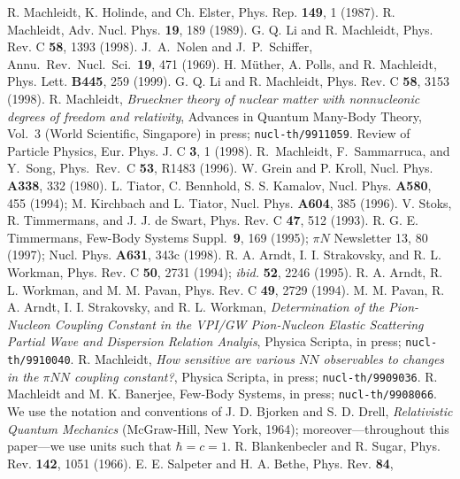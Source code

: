 \begin{references}
 R. Machleidt, K. Holinde, and Ch. Elster,
Phys. Rep. {\bf 149}, 1 (1987).
 R. Machleidt, Adv. Nucl. Phys. {\bf 19}, 189 (1989).
 G. Q. Li and R. Machleidt, Phys. Rev. C {\bf 58}, 1393 (1998).
 J.\ A.\ Nolen and J.\ P.\ Schiffer, Annu.\ Rev.\ Nucl.\ Sci.\
{\bf 19}, 471 (1969).
 H. M\"uther, A. Polls, and R. Machleidt,
Phys. Lett. {\bf B445}, 259 (1999).
 G. Q. Li and R. Machleidt, Phys. Rev. C {\bf 58}, 3153 (1998).
\bibitem{Mac99a} R. Machleidt, {\it Brueckner theory of nuclear matter
with nonnucleonic degrees of freedom and relativity},
Advances in Quantum Many-Body Theory,
Vol.~3 (World Scientific, Singapore) in press; {\tt nucl-th/9911059}.
\bibitem{PDG98} Review of Particle Physics, 
Eur. Phys. J. C {\bf 3}, 1 (1998).
 R.\ Machleidt, F.\ Sammarruca, and Y.\ Song,
Phys.\ Rev.\ C {\bf 53}, R1483 (1996).
 W. Grein and P. Kroll, Nucl. Phys. {\bf A338},
332 (1980).
 L. Tiator, C. Bennhold, S. S. Kamalov,
Nucl. Phys. {\bf A580}, 455 (1994);
M. Kirchbach and L. Tiator, Nucl. Phys. {\bf A604}, 385 (1996).
 V. Stoks, R. Timmermans, and J. J. de Swart, Phys. Rev.
C {\bf 47}, 512 (1993).
 R. G. E. Timmermans, Few-Body Systems Suppl.\ {\bf 9},
169 (1995); $\pi N$ Newsletter 13, 80 (1997); 
Nucl. Phys. {\bf A631}, 343c (1998).
R. A. Arndt, I. I. Strakovsky, and R. L. Workman,
Phys. Rev. C {\bf 50}, 2731 (1994); {\it ibid.}
{\bf 52}, 2246 (1995).
R. A. Arndt, R. L. Workman, and M. M. Pavan, 
Phys. Rev. C {\bf 49}, 2729 (1994).
 M. M. Pavan, R. A. Arndt, I. I. Strakovsky, and R. L. Workman,
{\it Determination of the Pion-Nucleon Coupling Constant in the VPI/GW
  Pion-Nucleon Elastic Scattering Partial Wave 
and Dispersion Relation Analyis}, 
Physica Scripta, in press;
{\tt nucl-th/9910040}.
 R. Machleidt, {\it How sensitive are various 
$NN$ observables to changes in the $\pi NN$ coupling constant?},
Physica Scripta, in press;
{\tt nucl-th/9909036}.
 R. Machleidt and M. K. Banerjee, Few-Body Systems,
in press; {\tt nucl-th/9908066}.
 We use the notation and conventions of 
J. D. Bjorken and S. D. Drell, {\it Relativistic
Quantum Mechanics} (McGraw-Hill, New York, 1964);
moreover---throughout this paper---we use units
such that $\hbar=c=1$.
 R. Blankenbecler and R. Sugar, Phys. Rev. {\bf 142},
1051 (1966).
 E. E. Salpeter and H. A. Bethe, Phys. Rev. {\bf 84},

\end{references}
